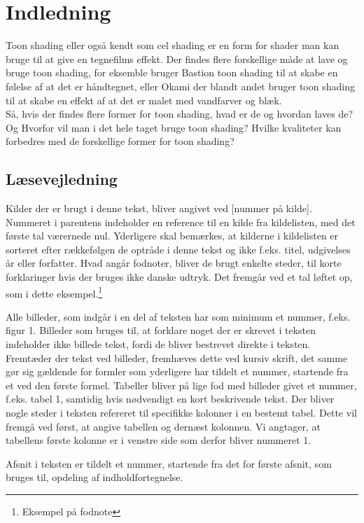 \section*{Indledning}
\thispagestyle{empty}
Toon shading eller også kendt som cel shading er en form for shader man kan bruge til at give en tegnefilms effekt. Der findes flere forskellige måde at lave og bruge toon shading, for eksemble bruger Bastion toon shading til at skabe en følelse af at det er håndtegnet, eller Okami der blandt andet bruger toon shading til at skabe en effekt af at det er malet med vandfarver og blæk.
\\
Så, hvis der findes flere former for toon shading, hvad er de og hvordan laves de? Og Hvorfor vil man i det hele taget bruge toon shading? Hvilke kvaliteter kan forbedres med de forskellige former for toon shading?
\\

\subsection*{Læsevejledning}
Kilder der er brugt i denne tekst, bliver angivet ved [nummer på kilde]. 
Nummeret i parentens indeholder en reference til en kilde fra kildelisten, med det første tal værernede nul. 
Yderligere skal bemærkes, at kilderne i kildelisten er sorteret efter rækkefølgen de optråde i denne tekst og ikke f.eks. titel, udgivelses år eller forfatter. 
Hvad angår fodnoter, bliver de brugt enkelte steder, til korte forklaringer hvis der bruges ikke danske udtryk. Det fremgår ved et tal løftet op, som i dette eksempel.\footnote[1]{Eksempel på fodnote}  

Alle billeder, som indgår i en del af teksten har som minimum et nummer, f.eks. figur 1. Billeder som bruges til, at forklare noget der er skrevet i teksten indeholder ikke
billede tekst, fordi de bliver bestrevet direkte i teksten. Fremtæder der tekst ved billeder, fremhæves dette ved kursiv skrift, det samme gør sig gældende for formler som
yderligere har tildelt et nummer, startende fra et ved den første formel. Tabeller bliver på lige fod med billeder givet et nummer, f.eks. tabel 1, samtidig hvis nødvendigt en kort beskrivende tekst. Der bliver nogle steder i teksten refereret til specifikke kolonner i en bestemt tabel. Dette vil fremgå ved først, at angive tabellen og dernæst kolonnen. Vi angtager, at tabellens første kolonne er i venstre side som derfor bliver nummeret 1. 

Afsnit i teksten er tildelt et nummer, startende fra det for første afsnit, som bruges til, opdeling af indholdfortegnelse. 
